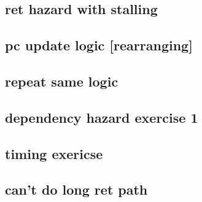 \subsection{ret hazard with stalling}


\subsection{pc update logic [rearranging]}


\subsection{repeat same logic}


\subsection{dependency hazard exercise 1}


\subsection{timing exericse}


\subsection{can't do long ret path}


